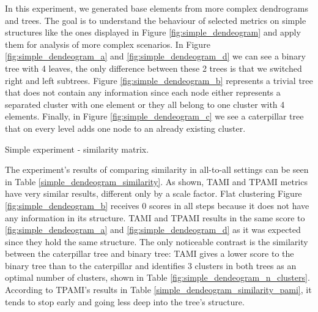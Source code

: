 In this experiment, we generated base elements from more complex dendrograms and trees. The goal is to understand the behaviour of selected metrics on simple structures like the ones displayed in Figure \ref{fig:simple_dendeogram} and apply them for analysis of more complex scenarios. In Figure \ref{fig:simple_dendeogram_a} and \ref{fig:simple_dendeogram_d} we can see a binary tree with 4 leaves, the only difference between these 2 trees is that we switched right and left subtrees. Figure \ref{fig:simple_dendeogram_b} represents a trivial tree that does not contain any information since each node either represents a separated cluster with one element or they all belong to one cluster with 4 elements. Finally, in Figure \ref{fig:simple_dendeogram_c} we see a caterpillar tree that on every level adds one node to an already existing cluster. 


\begin{table}[H]
	\centering
	\caption{Simple experiment - similarity matrix.  \label{simple_dendeogram_similarity}}
	\subfigure[TAMI.]{
		\centering
		
		\label{simple_dendeogram_similarity_ami}
	}
	\subfigure[TPAMI.]{
		
		\label{simple_dendeogram_similarity_pami}
	}
	\subfigure[RF.]{
		
		\label{simple_dendeogram_similarity_rf}
	}
	\subfigure[ZSS.]{
		
		\label{simple_dendeogram_similarity_zss}
	}
\end{table}


The experiment's results of comparing similarity in all-to-all settings can be seen in Table \ref{simple_dendeogram_similarity}. As shown, TAMI and TPAMI metrics have very similar results, different only by a scale factor. Flat clustering Figure \ref{fig:simple_dendeogram_b} receives 0 scores in all steps because it does not have any information in its structure. TAMI and TPAMI results in the same score to \ref{fig:simple_dendeogram_a} and \ref{fig:simple_dendeogram_d} as it was expected since they hold the same structure. The only noticeable contrast is the similarity between the caterpillar tree and binary tree: TAMI gives a lower score to the binary tree than to the caterpillar and identifies 3 clusters in both trees as an optimal number of clusters, shown in Table \ref{fig:simple_dendeogram_n_clusters}. According to TPAMI's results in Table \ref{simple_dendeogram_similarity_pami}, it tends to stop early and going less deep into the tree's structure. 

